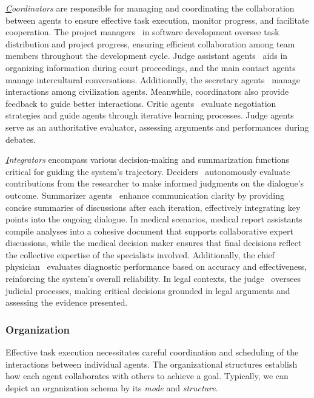 \textit{{\ul Coordinators}} are responsible for managing and coordinating the collaboration between agents to ensure effective task execution, monitor progress, and facilitate cooperation. The project managers~\cite{hong2023metagpt,zheng2023chatgpt} in software development oversee task distribution and project progress, ensuring efficient collaboration among team members throughout the development cycle. Judge assistant agents~\cite{he2024simucourt} aids in organizing information during court proceedings, and the main contact agents~\cite{li2024culturepark} manage intercultural conversations. Additionally, the secretary agents~\cite{jin2024if} manage interactions among civilization agents.
Meanwhile, coordinators also provide feedback to guide better interactions. Critic agents~\cite{fu2023improving} evaluate negotiation strategies and guide agents through iterative learning processes. Judge agents~\cite{xiong2023examining,liang2023encouraging,liang2024debatrix} serve as an authoritative evaluator, assessing arguments and performances during debates.

\textit{{\ul Integrators}} encompass various decision-making and summarization functions critical for guiding the system's trajectory. Deciders~\cite{nair2023dera} autonomously evaluate contributions from the researcher to make informed judgments on the dialogue's outcome. Summarizer agents~\cite{chan2023chateval} enhance communication clarity by providing concise summaries of discussions after each iteration, effectively integrating key points into the ongoing dialogue. In medical scenarios, medical report assistants~\cite{tang2023medagents} compile analyses into a cohesive document that supports collaborative expert discussions, while the medical decision maker ensures that final decisions reflect the collective expertise of the specialists involved. Additionally, the chief physician~\cite{fan2024ai} evaluates diagnostic performance based on accuracy and effectiveness, reinforcing the system's overall reliability. In legal contexts, the judge~\cite{he2024simucourt} oversees judicial processes, making critical decisions grounded in legal arguments and assessing the evidence presented.


\subsubsection{Organization}
Effective task execution necessitates careful coordination and scheduling of the interactions between individual agents. The organizational structures establish how each agent collaborates with others to achieve a goal. Typically, we can depict an organization schema by its \textit{mode} and \textit{structure}.

